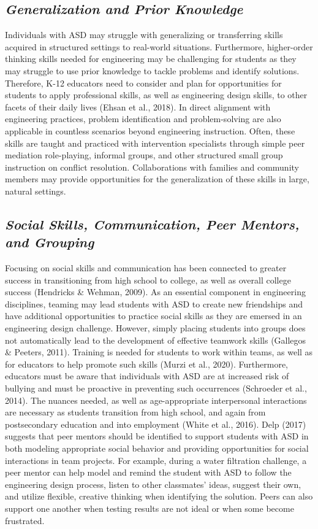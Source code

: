 \documentclass[11.5pt]{sig-alternate}
\begin{document}
\begin{large}
\subsection*{\textbf{\textit{Generalization and Prior Knowledge}}}

Individuals with ASD may struggle with generalizing or transferring skills acquired in structured settings to real-world situations. Furthermore, higher-order thinking skills needed for engineering may be challenging for students as they may struggle to use prior knowledge to tackle problems and identify solutions. Therefore, K-12 educators need to consider and plan for opportunities for students to apply professional skills, as well as engineering design skills, to other facets of their daily lives (Ehsan et al., 2018). In direct alignment with engineering practices, problem identification and problem-solving are also applicable in countless scenarios beyond engineering instruction. Often, these skills are taught and practiced with intervention specialists through simple peer mediation role-playing, informal groups, and other structured small group instruction on conflict resolution. Collaborations with families and community members may provide opportunities for the generalization of these skills in large, natural settings.

\subsection*{\textbf{\textit{Social Skills, Communication, Peer Mentors, and Grouping}}}

Focusing on social skills and communication has been connected to greater success in transitioning from high school to college, as well as overall college success (Hendricks \& Wehman, 2009). As an essential component in engineering disciplines, teaming may lead students with ASD to create new friendships and have additional opportunities to practice social skills as they are emersed in an engineering design challenge. However, simply placing students into groups does not automatically lead to the development of effective teamwork skills (Gallegos \& Peeters, 2011). Training is needed for students to work within teams, as well as for educators to help promote such skills (Murzi et al., 2020). Furthermore, educators must be aware that individuals with ASD are at increased risk of bullying and must be proactive in preventing such occurrences (Schroeder et al., 2014). The nuances needed, as well as age-appropriate interpersonal interactions are necessary as students transition from high school, and again from postsecondary education and into employment (White et al., 2016). Delp (2017) suggests that peer mentors should be identified to support students with ASD in both modeling appropriate social behavior and providing opportunities for social interactions in team projects. For example, during a water filtration challenge, a peer mentor can help model and remind the student with ASD to follow the engineering design process, listen to other classmates’ ideas, suggest their own, and utilize flexible, creative thinking when identifying the solution. Peers can also support one another when testing results are not ideal or when some become frustrated. 


\end{large}
\end{document}
